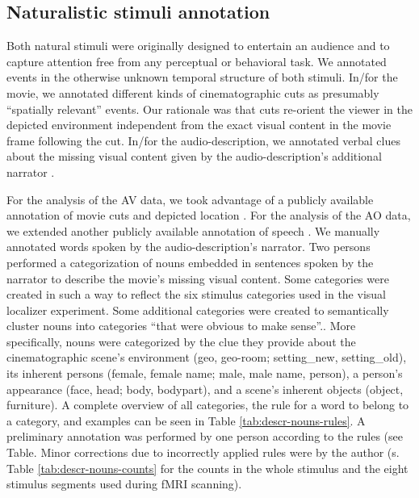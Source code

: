 \documentclass[english]{article}
\begin{document}
\subsection{Naturalistic stimuli annotation}

Both natural stimuli were originally designed to entertain an audience and to capture attention free from any perceptual or behavioral task.
We annotated events in the otherwise unknown temporal structure of both stimuli.
In/for the movie, we annotated different kinds of cinematographic cuts \citep{haeusler2016cutanno} as presumably ``spatially relevant'' events.
Our rationale was that cuts re-orient the viewer in the depicted environment
independent from the exact visual content in the movie frame following the cut.
In/for the audio-description, we annotated verbal clues about the missing visual content given by the audio-description's additional narrator \citep{haeusler2020speechanno}.

For the analysis of the AV data, we took advantage of a publicly available
annotation of movie cuts and depicted location \citep{haeusler2016cutanno}.
For the analysis of the AO data, we extended another publicly available
annotation of speech \citep{haeusler2020speechanno}. We manually annotated words
spoken by the audio-description's narrator.
Two persons performed a categorization of nouns embedded in sentences spoken by
the narrator to describe the movie's missing visual content. Some categories
were created in such a way to reflect the six stimulus categories used in the
visual localizer experiment. Some additional categories were created to
semantically cluster nouns into categories ``that were obvious to make
sense''..
More specifically, nouns were categorized by the clue they provide about the
cinematographic scene's environment (geo, geo-room; setting\_new, setting\_old),
its inherent persons (female, female name; male, male name, person), a person's
appearance (face, head; body, bodypart), and a scene's inherent objects (object,
furniture).
A complete overview of all categories, the rule for a word to belong to a
category, and examples can be seen in Table \ref{tab:descr-nouns-rules}.
A preliminary annotation was performed by one person according to the rules (see
Table. Minor corrections due to incorrectly applied rules were by the author (s.
Table \ref{tab:descr-nouns-counts} for the counts in the whole stimulus and the
eight stimulus segments used during fMRI scanning).
\end{document}
